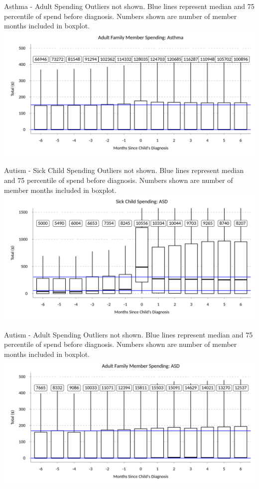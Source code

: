 \documentclass[xcolor=x11names,compress]{beamer}
\renewcommand{\(}{\begin{columns}}
\renewcommand{\)}{\end{columns}}
\newcommand{\<}[1]{\begin{column}{#1}}
\renewcommand{\>}{\end{column}}
\begin{document}
\begin{frame}{Asthma - Adult Spending}
\small
Outliers not shown. Blue lines represent median and 75 percentile of spend before diagnosis. Numbers
shown are number of member months included in boxplot. 
\includegraphics[width=\linewidth]{../figures/adult_family_spend_Asthma.png}
\end{frame}

\begin{frame}{Autism - Sick Child Spending}
\small
Outliers not shown. Blue lines represent median and 75 percentile of spend before diagnosis. Numbers
shown are number of member months included in boxplot. 
\includegraphics[width=\linewidth]{../figures/sick_child_spend_ASD.png}
\end{frame}

\begin{frame}{Autism - Adult Spending}
\small
Outliers not shown. Blue lines represent median and 75 percentile of spend before diagnosis. Numbers
shown are number of member months included in boxplot. 
\includegraphics[width=\linewidth]{../figures/adult_family_spend_ASD.png}
\end{frame}
\end{document}
